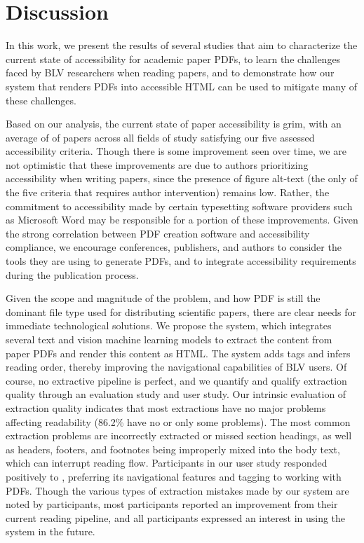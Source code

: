 \section{Discussion}
\label{sec:discussion}

In this work, we present the results of several studies that aim to characterize the current state of accessibility for academic paper PDFs, to learn the challenges faced by BLV researchers when reading papers, and to demonstrate how our \scially system that renders PDFs into accessible HTML can be used to mitigate many of these challenges. 

Based on our analysis, the current state of paper accessibility is grim, with an average of \percaccessible of papers across all fields of study satisfying our five assessed accessibility criteria. Though there is some improvement seen over time, we are not optimistic that these improvements are due to authors prioritizing accessibility when writing papers, since the presence of figure alt-text (the only of the five criteria that requires author intervention) remains low. Rather, the commitment to accessibility made by certain typesetting software providers such as Microsoft Word may be responsible for a portion of these improvements. Given the strong correlation between PDF creation software and accessibility compliance, we encourage conferences, publishers, and authors to consider the tools they are using to generate PDFs, and to integrate accessibility requirements during the publication process.

Given the scope and magnitude of the problem, and how PDF is still the dominant file type used for distributing scientific papers, there are clear needs for immediate technological solutions. We propose the \scially system, which integrates several text and vision machine learning models to extract the content from paper PDFs and render this content as HTML. The system adds tags and infers reading order, thereby improving the navigational capabilities of BLV users. Of course, no extractive pipeline is perfect, and we quantify and qualify extraction quality through an evaluation study and user study. Our intrinsic evaluation of extraction quality indicates that most extractions have no major problems affecting readability (86.2\% have no or only some problems). The most common extraction problems are incorrectly extracted or missed section headings, as well as headers, footers, and footnotes being improperly mixed into the body text, which can interrupt reading flow. Participants in our user study responded positively to \scially, preferring its navigational features and tagging to working with PDFs. Though the various types of extraction mistakes made by our system are noted by participants, most participants reported an improvement from their current reading pipeline, and all participants expressed an interest in using the system in the future. 

